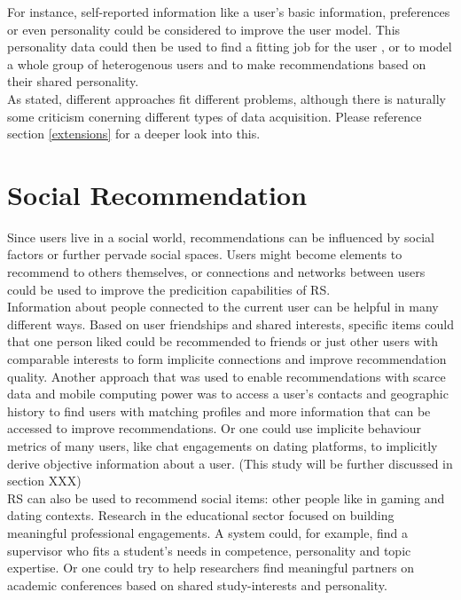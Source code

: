 \documentclass[nochapterpage,bigchapter,linedtoc,longdoc,colorback,accentcolor=tud3b,oneside]{tudreport}
\begin{document}
For instance, self-reported information like a user's basic information, preferences or even personality could be considered to improve the user model. \cite{nunes2012personality} This personality data could then be used to find a fitting job for the user \cite{costa1995persons}, or to model a whole group of heterogenous users and to make recommendations based on their shared personality. \cite{recio2009personality}\\
As stated, different approaches fit different problems, although there is naturally some criticism conerning different types of data acquisition. Please reference section \ref{extensions} for a deeper look into this.\\

\section{Social Recommendation}
Since users live in a social world, recommendations can be influenced by social factors or further pervade social spaces. Users might become elements to recommend to others themselves, or connections and networks between users could be used to improve the predicition capabilities of RS.\\
Information about people connected to the current user can be helpful in many different ways. Based on user friendships and shared interests, specific items could that one person liked could be recommended to friends \cite{feng2013recommendation} or just other users with comparable interests to form implicite connections and improve recommendation quality. \cite{hsu2018general} Another approach that was used to enable recommendations with scarce data and mobile computing power was to access a user's contacts and geographic history to find users with matching profiles and more information that can be accessed to improve recommendations. \cite{ramaswamy2009caesar} Or one could use implicite behaviour metrics of many users, like chat engagements on dating platforms, to implicitly derive objective information about a user. \cite{xia2015reciprocal} (This study will be further discussed in section XXX)\\
RS can also be used to recommend social items: other people like in gaming and dating contexts. Research in the educational sector focused on building meaningful professional engagements. A system could, for example, find a supervisor who fits a student's needs in competence, personality and topic expertise. \cite{zhang2016personality} Or one could try to help researchers find meaningful partners on academic conferences based on shared study-interests and personality. \cite{asabere2017improving}\\
\end{document}
